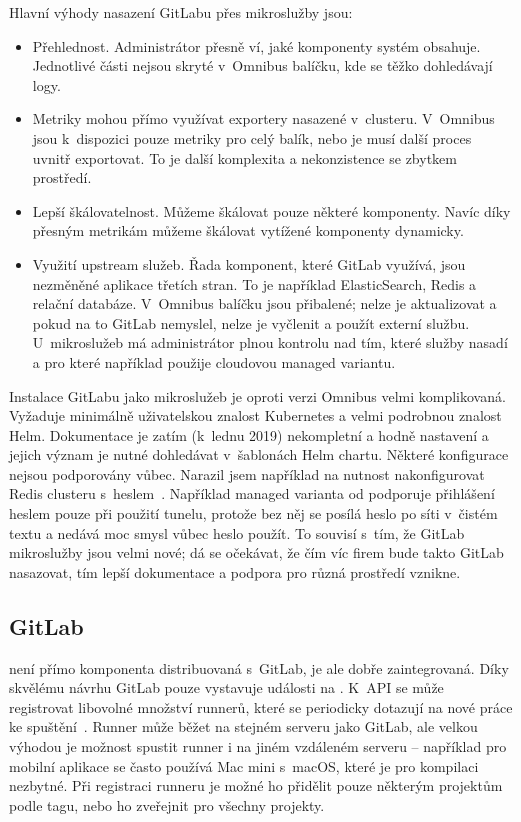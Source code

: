         Hlavní výhody nasazení GitLabu přes mikroslužby jsou:
        \begin{itemize}
            \item Přehlednost. Administrátor přesně ví, jaké komponenty systém obsahuje. Jednotlivé části nejsou skryté v~Omnibus balíčku, kde se těžko dohledávají logy.
            \item Metriky mohou přímo využívat exportery nasazené v~clusteru. V~Omnibus jsou k~dispozici pouze metriky pro celý balík, nebo je musí další proces uvnitř exportovat. To je další komplexita a nekonzistence se zbytkem prostředí.
            \item Lepší škálovatelnost. Můžeme škálovat pouze některé komponenty. Navíc díky přesným metrikám můžeme škálovat vytížené komponenty dynamicky.
            \item Využití upstream služeb. Řada komponent, které GitLab využívá, jsou nezměněné aplikace třetích stran. To je například ElasticSearch, Redis a relační databáze. V~Omnibus balíčku jsou přibalené; nelze je aktualizovat a pokud na to GitLab nemyslel, nelze je vyčlenit a použít externí službu. U~mikroslužeb má administrátor plnou kontrolu nad tím, které služby nasadí a pro které například použije cloudovou managed variantu.
        \end{itemize}

        Instalace GitLabu jako mikroslužeb je oproti verzi Omnibus velmi komplikovaná. Vyžaduje minimálně uživatelskou znalost Kubernetes a velmi podrobnou znalost Helm. Dokumentace je zatím (k~lednu 2019) nekompletní a hodně nastavení a jejich význam je nutné dohledávat v~šablonách Helm chartu. Některé konfigurace nejsou podporovány vůbec. Narazil jsem například na nutnost nakonfigurovat Redis clusteru s~heslem~\cite{gitlab-helm-issue-redis}. Například managed varianta od  podporuje přihlášení heslem pouze při použití  tunelu, protože bez něj se posílá heslo po síti v~čistém textu a nedává moc smysl vůbec heslo použít. To souvisí s~tím, že GitLab mikroslužby jsou velmi nové; dá se očekávat, že čím víc firem bude takto GitLab nasazovat, tím lepší dokumentace a podpora pro různá prostředí vznikne.

    \subsection{GitLab \CI}
        \CI není přímo komponenta distribuovaná s~GitLab, je ale dobře zaintegrovaná. Díky skvělému návrhu GitLab pouze vystavuje události na . K~API se může registrovat libovolné množství runnerů, které se periodicky  dotazují na nové práce ke spuštění~\cite{gitlab-runner-registration}. Runner může běžet na stejném serveru jako GitLab, ale velkou výhodou je možnost spustit runner i na jiném vzdáleném serveru -- například pro mobilní aplikace se často používá Mac mini s~macOS, které je pro kompilaci nezbytné. Při registraci runneru je možné ho přidělit pouze některým projektům podle tagu, nebo ho zveřejnit pro všechny projekty.

